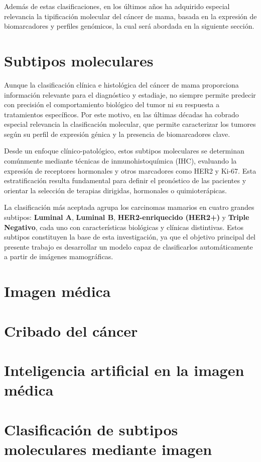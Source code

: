 \documentclass[a4paper,10pt]{book}
\begin{document}
Además de estas clasificaciones, en los últimos años ha adquirido especial relevancia la tipificación molecular del cáncer de mama, basada en la expresión de biomarcadores y perfiles genómicos, la cual será abordada en la siguiente sección.


\section{Subtipos moleculares}


Aunque la clasificación clínica e histológica del cáncer de mama proporciona información relevante para el diagnóstico y estadiaje, no siempre permite predecir con precisión el comportamiento biológico del tumor ni su respuesta a tratamientos específicos. Por este motivo, en las últimas décadas ha cobrado especial relevancia la clasificación molecular, que permite caracterizar los tumores según su perfil de expresión génica y la presencia de biomarcadores clave.

Desde un enfoque clínico-patológico, estos subtipos moleculares se determinan comúnmente mediante técnicas de inmunohistoquímica (IHC), evaluando la expresión de receptores hormonales y otros marcadores como HER2 y Ki-67. Esta estratificación resulta fundamental para definir el pronóstico de las pacientes y orientar la selección de terapias dirigidas, hormonales o quimioterápicas.

La clasificación más aceptada agrupa los carcinomas mamarios en cuatro grandes subtipos: \textbf{Luminal A}, \textbf{Luminal B}, \textbf{HER2-enriquecido (HER2+)} y \textbf{Triple Negativo}, cada uno con características biológicas y clínicas distintivas. Estos subtipos constituyen la base de esta investigación, ya que el objetivo principal del presente trabajo es desarrollar un modelo capaz de clasificarlos automáticamente a partir de imágenes mamográficas.

\section{Imagen médica}
\section{Cribado del cáncer}
\section{Inteligencia artificial en la imagen médica}
\section{Clasificación de subtipos moleculares mediante imagen}
\end{document}
